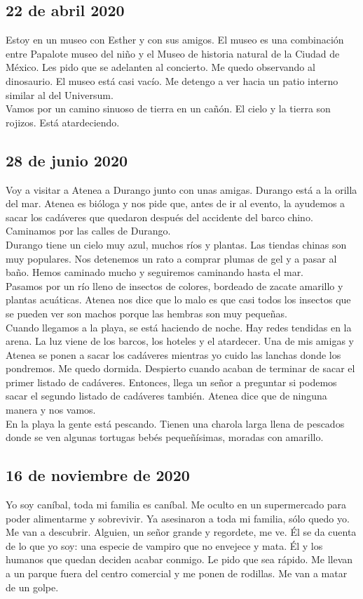 \documentclass[12pt]{book}
\begin{document}
\subsection*{\hfill 22 de abril 2020}

Estoy en un museo con Esther y con sus amigos. El museo es una combinación entre Papalote museo del niño y el Museo de historia natural de la Ciudad de México. Les pido que se adelanten al concierto. Me quedo observando al dinosaurio. El museo está casi vacío. Me detengo a ver hacia un patio interno similar al del Universum.\\
Vamos por un camino sinuoso de tierra en un cañón. El cielo y la tierra son rojizos. Está atardeciendo.

\subsection*{\hfill 28 de junio 2020}
Voy a visitar a Atenea a Durango junto con unas amigas. Durango está a la orilla del mar. 
Atenea es bióloga y nos pide que, antes de ir al evento, 
la ayudemos a sacar los cadáveres que quedaron después del accidente del barco chino. 
Caminamos por las calles de Durango. 
\\
Durango tiene un cielo muy azul, muchos ríos y plantas. Las tiendas chinas son muy populares. 
Nos detenemos un rato a comprar plumas de gel y a pasar al baño.  
Hemos caminado mucho y seguiremos caminando hasta el mar.
\\
Pasamos por un río lleno de insectos de colores,
 bordeado de zacate amarillo y plantas acuáticas. 
 Atenea nos dice que lo malo es que casi todos los insectos 
 que se pueden ver son machos porque las hembras son muy pequeñas. 
 \\
Cuando llegamos a la playa, se está haciendo de noche. Hay redes tendidas en la arena. La luz viene de los barcos, los hoteles y el atardecer. Una de mis amigas y Atenea se ponen a sacar los cadáveres mientras yo cuido las lanchas donde los pondremos. Me quedo dormida. Despierto cuando acaban de terminar de sacar el primer listado de cadáveres. Entonces, llega un señor a preguntar si podemos sacar el segundo listado de cadáveres también. Atenea dice que de ninguna manera y nos vamos. \\
En la playa la gente está pescando. Tienen una charola larga llena de pescados donde se ven algunas tortugas bebés pequeñísimas, moradas con amarillo.


\subsection*{\hfill 16 de noviembre de 2020}
Yo soy caníbal, toda mi familia es caníbal. Me oculto en un supermercado para poder alimentarme y sobrevivir. Ya asesinaron a toda mi familia, sólo quedo yo. Me van a descubrir. Alguien, un señor grande y regordete, me ve. Él se da cuenta de lo que yo soy: una especie de vampiro que no envejece y mata. Él y los humanos que quedan deciden acabar conmigo. Le pido que sea rápido. 
Me llevan a un parque fuera del centro comercial y me ponen de rodillas. Me van a matar de un golpe.  
\end{document}
